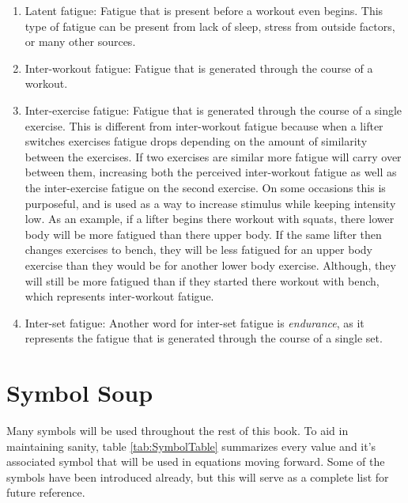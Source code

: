 \begin{enumerate}
	\item Latent fatigue: Fatigue that is present before a workout even begins. This type of fatigue can be present from lack of sleep, stress from outside factors, or many other sources.
	\item Inter-workout fatigue: Fatigue that is generated through the course of a workout.
	\item Inter-exercise fatigue: Fatigue that is generated through the course of a single exercise. This is different from inter-workout fatigue because when a lifter switches exercises fatigue drops depending on the amount of similarity between the exercises. If two exercises are similar more fatigue will carry over between them, increasing both the perceived inter-workout fatigue as well as the inter-exercise fatigue on the second exercise. On some occasions this is purposeful, and is used as a way to increase stimulus while keeping intensity low. As an example, if a lifter begins there workout with squats, there lower body will be more fatigued than there upper body. If the same lifter then changes exercises to bench, they will be less fatigued for an upper body exercise than they would be for another lower body exercise. Although, they will still be more fatigued than if they started there workout with bench, which represents inter-workout fatigue.
	\item Inter-set fatigue: Another word for inter-set fatigue is \textit{endurance}, as it represents the fatigue that is generated through the course of a single set.
\end{enumerate}


\section{Symbol Soup}
\label{sec:SymbolList}

Many symbols will be used throughout the rest of this book. To aid in maintaining sanity, table \ref{tab:SymbolTable} summarizes every value and it's associated symbol that will be used in equations moving forward. Some of the symbols have been introduced already, but this will serve as a complete list for future reference.

